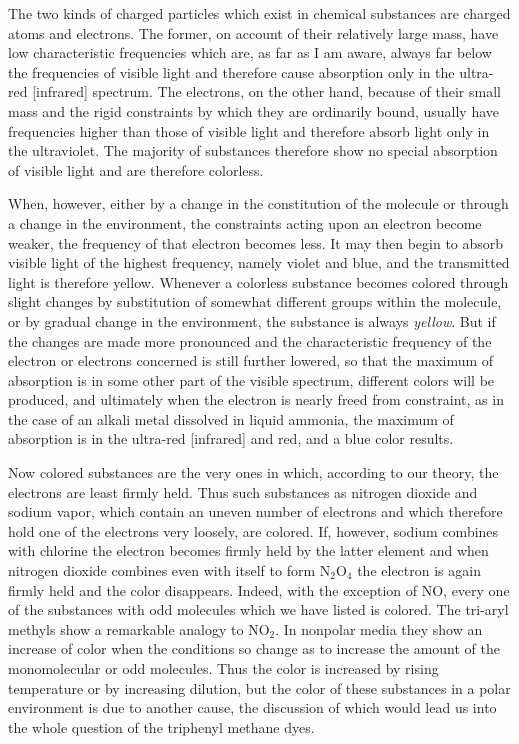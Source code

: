 \documentclass[11pt]{memoir}
\begin{document}
The two kinds of charged particles which exist in chemical substances are charged atoms and electrons.  The former, on account of their relatively large mass, have low characteristic frequencies which are, as far as I am aware, always far below the frequencies of visible light and therefore cause absorption only in the ultra-red [infrared] spectrum.  The electrons, on the other hand, because of their small mass and the rigid constraints by which they are ordinarily bound, usually have frequencies higher than those of visible light and therefore absorb light only in the ultraviolet.  The majority of substances therefore show no special absorption of visible light and are therefore colorless.

When, however, either by a change in the constitution of the molecule or through a change in the environment, the constraints acting upon an electron become weaker, the frequency of that electron becomes less.  It may then begin to absorb visible light of the highest frequency, namely violet and blue, and the transmitted light is therefore yellow.  Whenever a colorless substance becomes colored through slight changes by substitution of somewhat different groups within the molecule, or by gradual change in the environment, the substance is always \emph{yellow}.  But if the changes are made more pronounced and the characteristic frequency of the electron or electrons concerned is still further lowered, so that the maximum of absorption is in some other part of the visible spectrum, different colors will be produced, and ultimately when the electron is nearly freed from constraint, as in the case of an alkali metal dissolved in liquid ammonia, the maximum of absorption is in the ultra-red [infrared] and red, and a blue color results.

Now colored substances are the very ones in which, according to our theory, the electrons are least firmly held.  Thus such substances as nitrogen dioxide and sodium vapor, which contain an uneven number of electrons and which therefore hold one of the electrons very loosely, are colored.  If, however, sodium combines with chlorine the electron becomes firmly held by the latter element and when nitrogen dioxide combines even with itself to form $\mathrm{N_2O_4}$ the electron is again firmly held and the color disappears.  Indeed, with the exception of $\mathrm{NO}$, every one of the substances with odd molecules which we have listed is colored.  The tri-aryl methyls show a remarkable analogy to $\mathrm{NO_2}$.  In nonpolar media they show an increase of color when the conditions so change as to increase the amount of the monomolecular or odd molecules.  Thus the color is increased by rising temperature or by increasing dilution, but the color of these substances in a polar environment is due to another cause, the discussion of which would lead us into the whole question of the triphenyl methane dyes.
\end{document}
